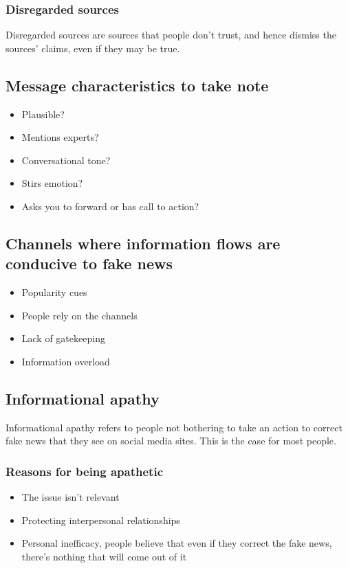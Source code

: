 \documentclass[11pt]{article}
\begin{document}
\subsubsection{Disregarded sources}
\label{sec:org406f2bb}
Disregarded sources are sources that people don't trust, and hence dismiss the sources' claims, even if they may be true.

\clearpage
\subsection{Message characteristics to take note}
\label{sec:org61493b7}
\begin{itemize}
\item Plausible?
\item Mentions experts?
\item Conversational tone?
\item Stirs emotion?
\item Asks you to forward or has call to action?
\end{itemize}
\subsection{Channels where information flows are conducive to fake news}
\label{sec:orgf4cf035}
\begin{itemize}
\item Popularity cues
\item People rely on the channels
\item Lack of gatekeeping
\item Information overload
\end{itemize}
\subsection{Informational apathy}
\label{sec:org2595cc0}
Informational apathy refers to people not bothering to take an action to correct fake news that they see on social media sites. This is the case for most people.
\subsubsection{Reasons for being apathetic}
\label{sec:org2487e0e}
\begin{itemize}
\item The issue isn't relevant
\item Protecting interpersonal relationships
\item Personal inefficacy, people believe that even if they correct the fake news, there's nothing that will come out of it
\end{itemize}
\end{document}
